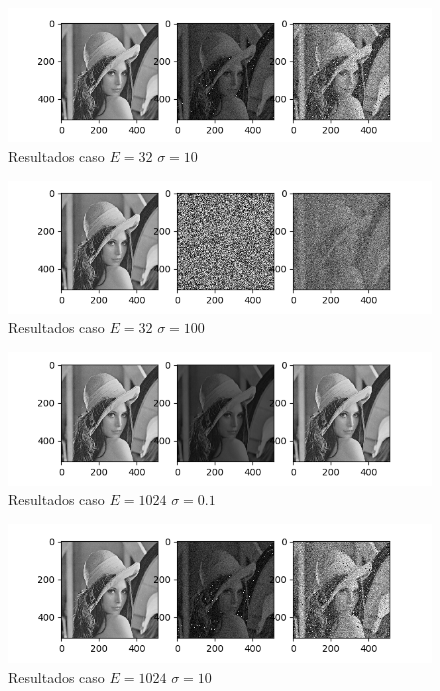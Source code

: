 \begin{figure}[H]
	\includegraphics[scale=0.9]{Imagenes/E32S10}
	\centering
	\caption{Resultados caso $E=32$ $\sigma = 10$ }
\end{figure}

\begin{figure}[H]
\includegraphics[scale=0.9]{Imagenes/E32S100}
\centering
\caption{Resultados caso $E=32$ $\sigma = 100$ }
\end{figure}

\begin{figure}[H]
\includegraphics[scale=0.9]{Imagenes/E1024S01}
\centering
\caption{Resultados caso $E=1024$ $\sigma = 0.1$ }
\end{figure}

\begin{figure}[H]
\includegraphics[scale=0.9]{Imagenes/E1024S10}
\centering
\caption{Resultados caso $E=1024$ $\sigma = 10$ }
\end{figure}

